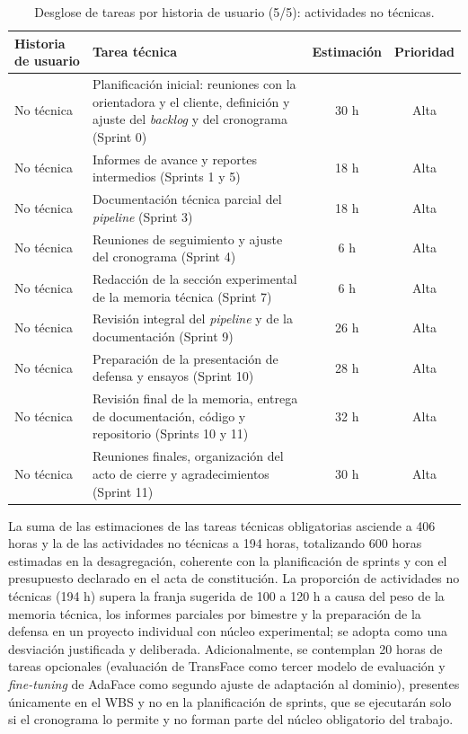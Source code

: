 \documentclass[
  11pt, %
]{charter}
\begin{document}
\begin{table}[htpb]
  \centering
  \caption{Desglose de tareas por historia de usuario (5/5): actividades no técnicas.}
  \begin{tabularx}{\linewidth}{@{}|X|X|c|c|@{}}
    \hline
    \rowcolor[HTML]{C0C0C0}
    Historia de usuario & Tarea técnica & Estimación & Prioridad \\ \hline

    No técnica & Planificación inicial: reuniones con la orientadora y el cliente, definición y ajuste del \textit{backlog} y del cronograma (Sprint 0) & 30 h & Alta \\ \hline
    No técnica & Informes de avance y reportes intermedios (Sprints 1 y 5) & 18 h & Alta \\ \hline
    No técnica & Documentación técnica parcial del \textit{pipeline} (Sprint 3) & 18 h & Alta \\ \hline
    No técnica & Reuniones de seguimiento y ajuste del cronograma (Sprint 4) & 6 h & Alta \\ \hline
    No técnica & Redacción de la sección experimental de la memoria técnica (Sprint 7) & 6 h & Alta \\ \hline
    No técnica & Revisión integral del \textit{pipeline} y de la documentación (Sprint 9) & 26 h & Alta \\ \hline
    No técnica & Preparación de la presentación de defensa y ensayos (Sprint 10) & 28 h & Alta \\ \hline
    No técnica & Revisión final de la memoria, entrega de documentación, código y repositorio (Sprints 10 y 11) & 32 h & Alta \\ \hline
    No técnica & Reuniones finales, organización del acto de cierre y agradecimientos (Sprint 11) & 30 h & Alta \\ \hline

  \end{tabularx}
\end{table}

La suma de las estimaciones de las tareas técnicas obligatorias asciende a 406 horas y la de las actividades no técnicas a 194 horas, totalizando 600 horas estimadas en la desagregación, coherente con la planificación de sprints y con el presupuesto declarado en el acta de constitución. La proporción de actividades no técnicas (194 h) supera la franja sugerida de 100 a 120 h a causa del peso de la memoria técnica, los informes parciales por bimestre y la preparación de la defensa en un proyecto individual con núcleo experimental; se adopta como una desviación justificada y deliberada. Adicionalmente, se contemplan 20 horas de tareas opcionales (evaluación de TransFace como tercer modelo de evaluación y \textit{fine-tuning} de AdaFace como segundo ajuste de adaptación al dominio), presentes únicamente en el WBS y no en la planificación de sprints, que se ejecutarán solo si el cronograma lo permite y no forman parte del núcleo obligatorio del trabajo.
\end{document}

